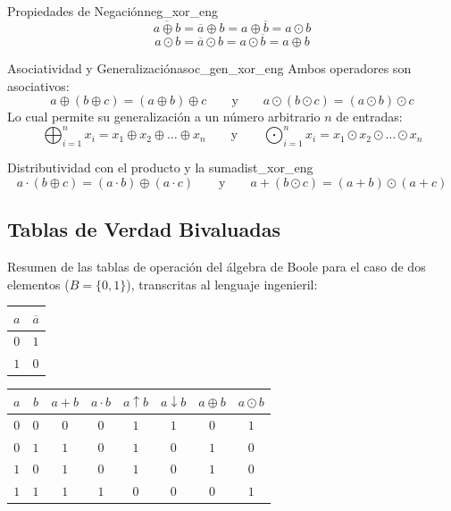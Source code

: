 \documentclass[12pt,a4paper]{article}
\begin{document}
\setcounter{tcb@cnt@teorema}{25}
\begin{teorema}{Propiedades de Negación}{neg_xor_eng}
\[ \overline{a \oplus b} = \overline{a} \oplus b = a \oplus \overline{b} = a \odot b \]
\[ \overline{a \odot b} = \overline{a} \odot b = a \odot \overline{b} = a \oplus b \]
\end{teorema}

\setcounter{tcb@cnt@teorema}{26}
\begin{teorema}{Asociatividad y Generalización}{asoc_gen_xor_eng}
Ambos operadores son asociativos:
\[ a \oplus (b \oplus c) = (a \oplus b) \oplus c \qquad \text{y} \qquad a \odot (b \odot c) = (a \odot b) \odot c \]
Lo cual permite su generalización a un número arbitrario $n$ de entradas:
\[ \bigoplus_{i=1}^{n} x_i = x_1 \oplus x_2 \oplus \dots \oplus x_n \qquad \text{y} \qquad \bigodot_{i=1}^{n} x_i = x_1 \odot x_2 \odot \dots \odot x_n \]
\end{teorema}

\setcounter{tcb@cnt@teorema}{28}
\begin{teorema}{Distributividad con el producto y la suma}{dist_xor_eng}
\[ a \cdot (b \oplus c) = (a \cdot b) \oplus (a \cdot c) \qquad \text{y} \qquad a + (b \odot c) = (a + b) \odot (a + c) \]
\end{teorema}

\subsection*{Tablas de Verdad Bivaluadas}

Resumen de las tablas de operación del álgebra de Boole para el caso de dos elementos ($B=\{0,1\}$), transcritas al lenguaje ingenieril:

\begin{table}[h!]
\centering
\renewcommand{\arraystretch}{1.2}
\begin{tabular}{c||c}
\hline
$a$ & $\overline{a}$ \\
\hline\hline
$0$ & $1$ \\
$1$ & $0$ \\
\hline
\end{tabular}
\qquad
\begin{tabular}{cc||c|c|c|c|c|c}
\hline
$a$ & $b$ & $a + b$ & $a \cdot b$ & $a \uparrow b$ & $a \downarrow b$ & $a \oplus b$ & $a \odot b$ \\
\hline\hline
$0$ & $0$ & $0$ & $0$ & $1$ & $1$ & $0$ & $1$ \\
$0$ & $1$ & $1$ & $0$ & $1$ & $0$ & $1$ & $0$ \\
$1$ & $0$ & $1$ & $0$ & $1$ & $0$ & $1$ & $0$ \\
$1$ & $1$ & $1$ & $1$ & $0$ & $0$ & $0$ & $1$ \\
\hline
\end{tabular}
\end{table}

\makeatother
\end{document}
